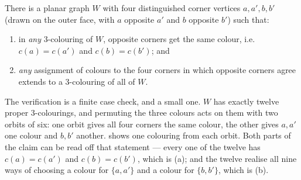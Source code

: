 \begin{claim}\label{claim:planar-gadget}
There is a planar graph $W$ with four distinguished corner vertices
$a, a', b, b'$ (drawn on the outer face, with $a$ opposite $a'$ and $b$
opposite $b'$) such that:
\begin{enumerate}[label=(\alph*),nosep]
  \item in \emph{any} $3$-colouring of $W$, opposite corners get the same
        colour, i.e.\ $c(a) = c(a')$ and $c(b) = c(b')$; and
  \item \emph{any} assignment of colours to the four corners in which opposite
        corners agree extends to a $3$-colouring of all of $W$.
\end{enumerate}
\end{claim}

The verification is a finite case check, and a small one. $W$ has exactly
twelve proper $3$-colourings, and permuting the three colours acts on them with
two orbits of six: one orbit gives all four corners the same colour, the other
gives $a,a'$ one colour and $b,b'$ another.  shows one
colouring from each orbit. Both parts of the claim can be read off that
statement --- every one of the twelve has $c(a) = c(a')$ and $c(b) = c(b')$,
which is (a); and the twelve realise all nine ways of choosing a colour for
$\{a,a'\}$ and a colour for $\{b,b'\}$, which is (b).

